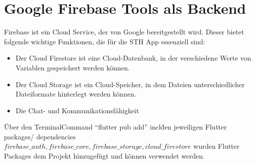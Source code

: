 \section{Google Firebase Tools als Backend}
Firebase ist ein Cloud Service, der von Google bereitgestellt wird.
Dieser bietet folgende wichtige Funktionen, die für die STH App essenziell sind:
\begin{itemize}
    \item Der Cloud Firestore ist eine Cloud-Datenbank, in der verschiedene Werte von Variablen gespeichert werden können.
    \item Der Cloud Storage ist ein Cloud-Speicher, in dem Dateien unterschiedlicher Dateiformate hinterlegt werden können.
    \item Die Chat- und Kommunikationsfähigkeit
\end{itemize}
Über den Terminal\-Command ``flutter pub add'' incl\. den jeweiligen Flutter packages/ dependencies \(firebase\_auth, firebase\_core, firebase\_storage, cloud\_firestore\) wurden Flutter Packages dem Projekt hinzugefügt und können verwendet werden.

